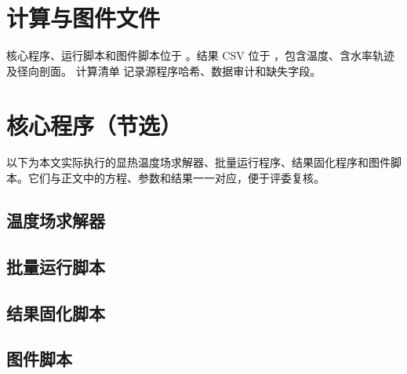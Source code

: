 \documentclass[withoutpreface,bwprint]{cumcmthesis}
\begin{document}
\clearpage
\begin{appendices}
\section{计算与图件文件}
核心程序、运行脚本和图件脚本位于 。结果 CSV 位于 ，包含温度、含水率轨迹及径向剖面。
计算清单  记录源程序哈希、数据审计和缺失字段。
\section{核心程序（节选）}
以下为本文实际执行的显热温度场求解器、批量运行程序、结果固化程序和图件脚本。它们与正文中的方程、参数和结果一一对应，便于评委复核。
\subsection{温度场求解器}
\subsection{批量运行脚本}
\subsection{结果固化脚本}
\subsection{图件脚本}
\end{appendices}
\end{document}
